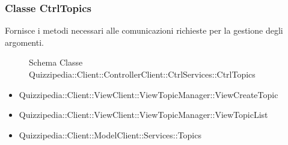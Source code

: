 \subsubsection{Classe CtrlTopics}
Fornisce i metodi necessari alle comunicazioni richieste per la gestione degli argomenti.
\begin{figure}[H]
\centering
\noindent{}
\caption{Schema Classe Quizzipedia::Client::ControllerClient::CtrlServices::CtrlTopics}
\end{figure}
\begin{itemize}
\item Quizzipedia::Client::ViewClient::ViewTopicManager::ViewCreateTopic
\item Quizzipedia::Client::ViewClient::ViewTopicManager::ViewTopicList
\end{itemize}
\begin{itemize}
\item Quizzipedia::Client::ModelClient::Services::Topics
\end{itemize}

